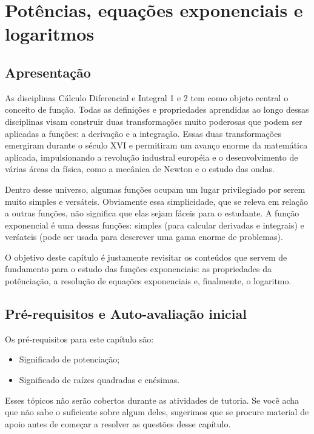 \documentclass[main_estudante.tex]{subfiles}
\begin{document}
\chapter{Potências, equações exponenciais e logaritmos}

\section{Apresentação}

As disciplinas Cálculo Diferencial e Integral 1 e 2 tem como objeto central o conceito de função. Todas as definições e propriedades aprendidas ao longo dessas disciplinas visam construir duas transformações muito poderosas que podem ser aplicadas a funções: a derivação e a integração. Essas duas transformações emergiram durante o século XVI e permitiram um avanço enorme da matemática aplicada, impulsionando a revolução industral européia e o desenvolvimento de várias áreas da física, como a mecânica de Newton e o estudo das ondas.

Dentro desse universo, algumas funções ocupam um lugar privilegiado por serem muito simples e versáteis. Obviamente essa simplicidade, que se releva em relação a outras funções, não significa que elas sejam fáceis para o estudante. A função exponencial é uma dessas funções: simples (para calcular derivadas e integrais) e verśateis (pode ser usada para descrever uma gama enorme de problemas).

O objetivo deste capítulo é justamente revisitar os conteúdos que servem de fundamento para o estudo das funções exponenciais: as propriedades da potênciação, a resolução de equações exponenciais e, finalmente, o logaritmo.

\newpage

\section{Pré-requisitos e Auto-avaliação inicial}

Os pré-requisitos para este capítulo são:
\begin{itemize}
 \item Significado de potenciação;
 \item Significado de raízes quadradas e enésimas.
\end{itemize}

Esses tópicos não serão cobertos durante as atividades de tutoria. Se você acha que não sabe o suficiente sobre algum deles, sugerimos que se procure material de apoio antes de começar a resolver as questões desse capítulo.
\end{document}

